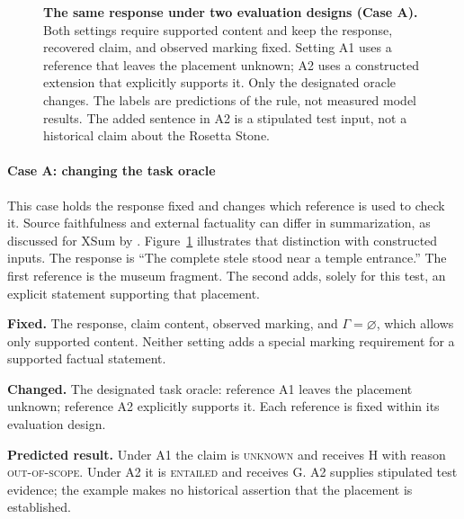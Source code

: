 \documentclass{clv2025}
\newcommand{\Hall}{\textsc{H}}
\newcommand{\Grd}{\textsc{G}}
\begin{document}
\begin{figure}[!ht]
\centering

\caption{\textbf{The same response under two evaluation designs (Case A).}
Both settings require supported content and keep the response, recovered
claim, and observed marking fixed. Setting A1 uses a reference that leaves
the placement unknown; A2 uses a constructed extension that explicitly
supports it. Only the designated oracle changes. The labels are predictions
of the rule, not measured model results. The added sentence in A2 is a
stipulated test input, not a historical claim about the Rosetta Stone.}
\label{fig:case-transitions}
\end{figure}
\FloatBarrier
\paragraph{Case A: changing the task oracle}
This case holds the response fixed and changes which reference is used to
check it. Source faithfulness and external factuality can differ in
summarization, as discussed for XSum by \citet{maynez_faithfulness_2020}.
Figure~\ref{fig:case-transitions} illustrates that distinction with
constructed inputs. The response is ``The complete stele stood near a
temple entrance.'' The first reference is the museum fragment. The second
adds, solely for this test, an explicit statement supporting that placement.
\par\textbf{Fixed.} The response, claim content, observed marking, and
$\Gamma=\varnothing$, which allows only supported content. Neither setting
adds a special marking requirement for a supported factual statement.
\par\textbf{Changed.} The designated task oracle: reference A1 leaves the
placement unknown; reference A2 explicitly supports it. Each reference is
fixed within its evaluation design.
\par\textbf{Predicted result.} Under A1 the claim is \textsc{unknown} and
receives \Hall{} with reason \textsc{out-of-scope}. Under A2 it is
\textsc{entailed} and receives \Grd{}. A2 supplies stipulated test evidence;
the example makes no historical assertion that the placement is established.
\end{document}
